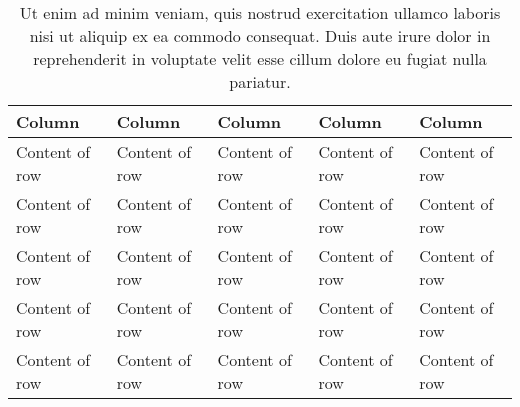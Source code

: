 \begin{table}[t!] %
\centering   
\scriptsize %
\sffamily %
\caption[Caption for the LOT.]{
Ut enim ad minim veniam, quis nostrud exercitation ullamco laboris nisi ut aliquip ex ea commodo consequat. Duis aute irure dolor in reprehenderit in voluptate velit esse cillum dolore eu fugiat nulla pariatur.
}
\label{tbl:simple}
\begin{tabular}{ 
>{\raggedright\arraybackslash}m{2.3cm}>{\raggedright\arraybackslash}m{2.3cm} >{\raggedright\arraybackslash}m{2.3cm} >{\raggedright\arraybackslash}m{2.3cm} >{\raggedright\arraybackslash}m{2.3cm}} 
    \toprule 
    \textbf{Column} & \textbf{Column} & \textbf{Column} & \textbf{Column} & \textbf{Column} \\
    \midrule
    Content of row & Content of row & Content of row & Content of row & Content of row \\
    Content of row & Content of row & Content of row & Content of row & Content of row \\
    Content of row & Content of row & Content of row & Content of row & Content of row \\
    Content of row & Content of row & Content of row & Content of row & Content of row \\
    Content of row & Content of row & Content of row & Content of row & Content of row \\
    \bottomrule
    \end{tabular}
\end{table}